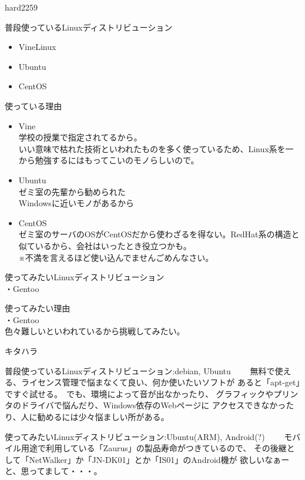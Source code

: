 \begin{prework}{ hard2259 }

普段使っているLinuxディストリビューション
\begin{itemize}
\item VineLinux
\item Ubuntu
\item CentOS
\end{itemize}

使っている理由

\begin{itemize}
\item Vine\\
      学校の授業で指定されてるから。\\
      いい意味で枯れた技術といわれたものを多く使っているため、Linux系を一から勉強するにはもってこいのモノらしいので。\\

\item Ubuntu \\
      ゼミ室の先輩から勧められた\\
      Windowsに近いモノがあるから

\item CentOS \\
      ゼミ室のサーバのOSがCentOSだから使わざるを得ない。RedHat系の構造と似ているから、会社はいったとき役立つかも。\\
      ※不満を言えるほど使い込んでませんごめんなさい。
\end{itemize}


使ってみたいLinuxディストリビューション\\
・Gentoo

使ってみたい理由\\
・Gentoo\\
 色々難しいといわれているから挑戦してみたい。

\end{prework}



\begin{prework}{ キタハラ }

普段使っているLinuxディストリビューション:debian, Ubuntu
　　無料で使える、ライセンス管理で悩まなくて良い、何か使いたいソフトが
あると「apt-get」ですぐ試せる。　でも、環境によって音が出なかったり、
グラフィックやプリンタのドライバで悩んだり、Windows依存のWebページに
アクセスできなかったり、人に勧めるには少々悩ましい所がある。

使ってみたいLinuxディストリビューション:Ubuntu(ARM), Android(?)
　　モバイル用途で利用している「Zaurus」の製品寿命がつきているので、
その後継として「NetWalker」か「JN-DK01」とか「IS01」のAndroid機が
欲しいなぁーと、思ってまして・・・。


\end{prework}



